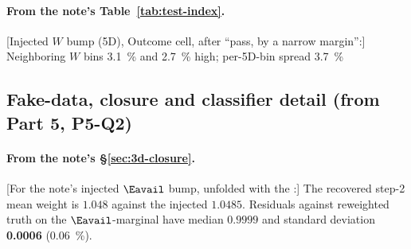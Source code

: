 \paragraph{From the note's Table~\ref{tab:test-index}.}
[Injected $W$ bump (5D), Outcome cell, after ``pass, by a narrow margin'':] Neighboring $W$ bins \SI{3.1}{\percent} and \SI{2.7}{\percent} high; per-5D-bin spread \SI{3.7}{\percent}

\subsection{Fake-data, closure and classifier detail (from Part 5, P5-Q2)}

\paragraph{From the note's \S\ref{sec:3d-closure}.}
[For the note's injected $\Eavail$ bump, unfolded with the \estPurity{}:] The recovered step-2 mean weight is $1.048$ against the injected $1.0485$. Residuals against reweighted truth on the $\Eavail$-marginal have median $0.9999$ and standard deviation \textbf{\num{0.0006}} (\SI{0.06}{\percent}).

